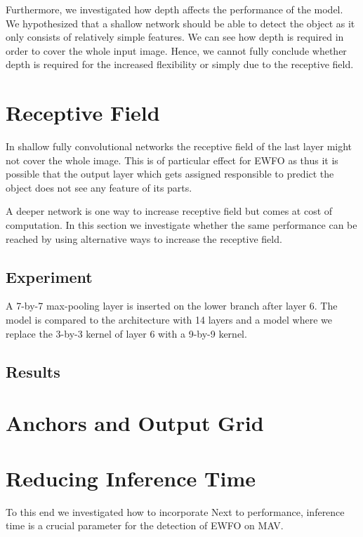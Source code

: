 	Furthermore, we investigated how depth affects the performance of the model. We hypothesized that a shallow network should be able to detect the object as it only consists of relatively simple features. We can see how depth is required in order to cover the whole input image. Hence, we cannot fully conclude whether depth is required for the increased flexibility or simply due to the receptive field. 
	
	\section{Receptive Field}
	
	In shallow fully convolutional networks the receptive field of the last layer might not cover the whole image. This is of particular effect for \ac{EWFO} as thus it is possible that the output layer which gets assigned responsible to predict the object does not see any feature of its parts.
	
	A deeper network is one way to increase receptive field but comes at cost of computation. In this section we investigate whether the same performance can be reached by using alternative ways to increase the receptive field.
	
	\subsection{Experiment}
	
	 A 7-by-7 max-pooling layer is inserted on the lower branch after layer 6. The model is compared to the architecture with 14 layers and a model where we replace the 3-by-3 kernel of layer 6 with a 9-by-9 kernel.
	 
	 \subsection{Results}
	 
	\section{Anchors and Output Grid}
		
	\section{Reducing Inference Time}
	
	To this end we investigated how to incorporate 
	Next to performance, inference time is a crucial parameter for the detection of \ac{EWFO} on \ac{MAV}. 
	
